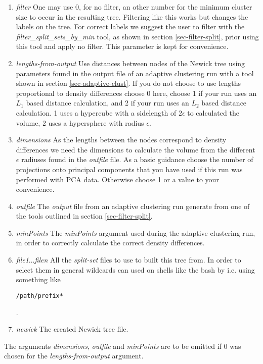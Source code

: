 \begin{enumerate}
  \item \emph{filter} One may use 0, for no filter, an other number for the
    minimum cluster size to occur in the resulting tree. Filtering
    like this works but changes the labels on the tree. For correct
    labels we suggest the user to filter with the
    \emph{filter\_split\_sets\_by\_min} tool, as shown in section
    \ref{sec-filter-split}, prior using this tool and
    apply no filter. This parameter is kept for convenience.
  \item \emph{lengths-from-output} Use distances between nodes of the
    Newick tree using parameters found in the output file of an
    adaptive clustering run with a tool shown in section
    \ref{sec-adaptive-clust}. If you do not choose to use lengths
    proportional to density differences choose 0 here, choose 1 if
    your run uses an $L_1$ based distance calculation, and 2 if your
    run uses an $L_2$ based distance calculation. 1 uses a hypercube
    with a sidelength of $2\epsilon$ to calculated the volume, 2 uses
    a hypersphere with radius $\epsilon$.
  \item \emph{dimensions} As the lengths between the nodes correspond
    to density differences we need the dimensions to calculate the
    volume from the different $\epsilon$ radiuses found in the
    \emph{outfile} file. As a basic guidance choose the number of
    projections onto principal components that you have used if this
    run was performed with PCA data. Otherwise choose 1 or a value to
    your convenience.
  \item \emph{outfile} The \emph{output} file from an adaptive
    clustering run generate from one of the tools outlined in section
    \ref{sec-filter-split}.
  \item \emph{minPoints} The \emph{minPoints} argument used during the
    adaptive clustering run, in order to correctly calculate the
    correct density differences.
  \item \emph{file1$\ldots$filen} All the \emph{split-set} files
    to use to built this tree from. In order to select them in general
    wildcards can used on shells like the bash by i.e. using something
    like \begin{verbatim}/path/prefix*\end{verbatim}.
  \item \emph{newick} The created Newick tree file. 
\end{enumerate}
The arguments \emph{dimensions}, \emph{outfile} and \emph{minPoints}
are to be omitted if 0 was chosen for the \emph{lengths-from-output}
argument.

